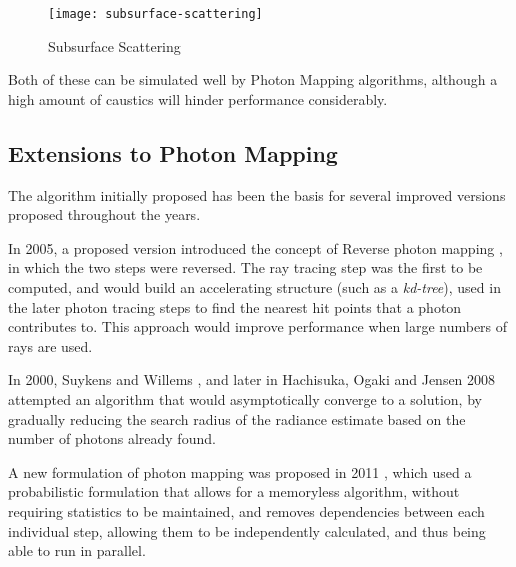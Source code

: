 \documentclass[main.tex]{subfiles}
\begin{document}
\begin{figure}[!htp]
  \centering
  \texttt{[image: subsurface-scattering]}
  \caption{Subsurface Scattering \label{fig:subscat}}
\end{figure}

Both of these can be simulated well by Photon Mapping algorithms, although a high amount of caustics will hinder performance considerably.


\subsection{Extensions to Photon Mapping}

The algorithm initially proposed \cite{jensen1996global} has been the basis for several improved versions proposed throughout the years.

In 2005, a proposed version introduced the concept of Reverse photon mapping \cite{havran2005fast}, in which the two steps were reversed. The ray tracing step was the first to be computed, and would build an accelerating structure (such as a \textit{kd-tree}), used in the later photon tracing steps to find the nearest hit points that a photon contributes to. This approach would improve performance when large numbers of rays are used.

In 2000, Suykens and Willems \cite{suykens2000adaptive}, and later in Hachisuka, Ogaki and Jensen 2008 \cite{hachisuka2008progressive} attempted an algorithm that would asymptotically converge to a solution, by gradually reducing the search radius of the radiance estimate based on the number of photons already found.

A new formulation of photon mapping was proposed in 2011 \cite{knaus2011progressive}, which used a probabilistic formulation that allows for a memoryless algorithm, without requiring statistics to be maintained, and removes dependencies between each individual step, allowing them to be independently calculated, and thus being able to run in parallel.
\end{document}
